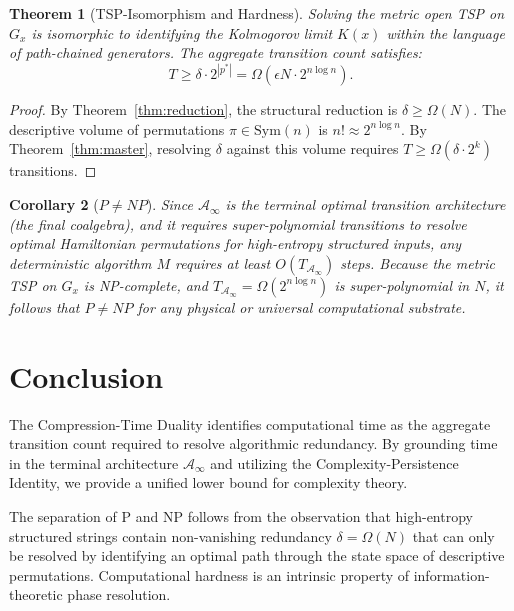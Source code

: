 \documentclass[12pt,a4paper]{article}
\theoremstyle{plain}
\newtheorem{theorem}{Theorem}[section]
\newtheorem{corollary}[theorem]{Corollary}
\theoremstyle{definition}
\begin{document}
\begin{theorem}[TSP-Isomorphism and Hardness] \label{thm:hardness}
Solving the metric open TSP on $G_x$ is isomorphic to identifying the Kolmogorov limit $K(x)$ 
within the language of path-chained generators. The aggregate transition count satisfies:
\begin{equation}
    T \ge \delta \cdot 2^{|p^*|} = \Omega\!\left(\epsilon N \cdot 2^{n \log n}\right).
\end{equation}
\end{theorem}
\begin{proof}
By Theorem~\ref{thm:reduction}, the structural reduction is $\delta \ge \Omega(N)$. The 
descriptive volume of permutations $\pi \in \mathrm{Sym}(n)$ is $n! \approx 2^{n \log n}$. 
By Theorem~\ref{thm:master}, resolving $\delta$ against this volume requires $T \ge 
\Omega(\delta \cdot 2^k)$ transitions.
\end{proof}

\begin{corollary}[$P \ne NP$]
Since $\mathcal{A}_\infty$ is the terminal optimal transition architecture (the final 
coalgebra), and it requires super-polynomial transitions to resolve optimal Hamiltonian 
permutations for high-entropy structured inputs, any deterministic algorithm $M$ requires 
at least $O(T_{\mathcal{A}_\infty})$ steps. Because the metric TSP on $G_x$ is NP-complete, 
and $T_{\mathcal{A}_\infty} = \Omega(2^{n \log n})$ is super-polynomial in $N$, it 
follows that $P \ne NP$ for any physical or universal computational substrate.
\end{corollary}

\section{Conclusion}

The Compression-Time Duality identifies computational time as the aggregate transition 
count required to resolve algorithmic redundancy. By grounding time in the terminal 
architecture $\mathcal{A}_\infty$ and utilizing the Complexity-Persistence Identity, we 
provide a unified lower bound for complexity theory. 

The separation of P and NP follows from the observation that high-entropy structured strings 
contain non-vanishing redundancy $\delta = \Omega(N)$ that can only be resolved by 
identifying an optimal path through the state space of descriptive permutations. 
Computational hardness is an intrinsic property of information-theoretic phase resolution.
\end{document}
